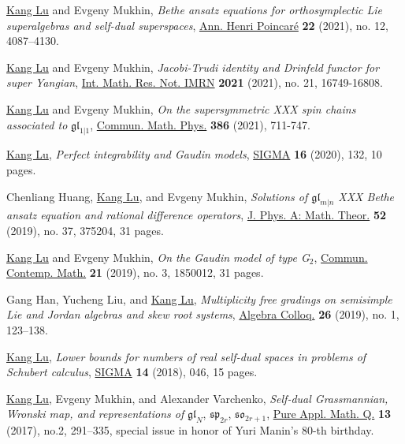\documentclass[11pt,letterpaper,roman,colorlinks,urlcolor=blue,linkcolor=blue
]{moderncv}
\begin{document}
\begin{etaremune}[leftmargin=1.17cm]
\item \underline{Kang Lu} and Evgeny Mukhin, {\textit{Bethe ansatz equations for orthosymplectic Lie superalgebras and self-dual superspaces}}, \href{https://doi.org/10.1007/s00023-021-01091-8}{Ann. Henri Poincar\'{e}} \textbf{22} (2021), no. 12, 4087--4130.

\item \underline{Kang Lu} and Evgeny Mukhin, {\textit{Jacobi-Trudi identity and Drinfeld functor for super Yangian}}, \href{https://dx.doi.org/10.1093/imrn/rnab023}{Int. Math. Res. Not. IMRN} \textbf{2021} (2021), no. 21, 16749-16808.

\item \underline{Kang Lu} and Evgeny Mukhin, {\textit{On the supersymmetric XXX spin chains associated to} $\mathfrak{gl}_{1|1}$}, \href{https://dx.doi.org/10.1007/s00220-021-04155-2}{Commun. Math. Phys.} \textbf{386} (2021), 711-747.

\item \underline{Kang Lu}, \textit{Perfect integrability and Gaudin models}, \href{https://www.emis.de/journals/SIGMA/2020/132/}{SIGMA} \textbf{16} (2020), 132, 10 pages.
  
\item Chenliang Huang, \underline{Kang Lu}, and Evgeny Mukhin, {\textit{Solutions of $\mathfrak{gl}_{m|n}$ XXX Bethe ansatz equation and rational difference operators}}, \href{https://doi.org/10.1088/1751-8121/ab1960}{J. Phys. A: Math. Theor.} \textbf{52} (2019), no. 37, 375204, 31 pages.   
            
\item \underline{Kang Lu} and Evgeny Mukhin, {\textit{On the Gaudin model of type G$_2$}}, \href{https://doi.org/10.1142/S0219199718500128}{Commun. Contemp. Math.} \textbf{21} (2019), no. 3, 1850012, 31 pages.

\item Gang Han, Yucheng Liu, and \underline{Kang Lu}, {\textit{Multiplicity free gradings on semisimple Lie and Jordan algebras and skew root systems}}, \href{https://doi.org/10.1142/S1005386719000129}{Algebra Colloq.} {\textbf{26}} (2019), no. 1, 123--138.
            
\item \underline{Kang Lu}, {\textit{Lower bounds for numbers of real self-dual spaces in problems of Schubert calculus}}, \href{https://doi.org/10.3842/SIGMA.2018.046}{SIGMA} {\textbf{14}} (2018), 046, 15 pages. 
            
\item \underline{Kang Lu}, Evgeny Mukhin, and Alexander Varchenko, {\textit{Self-dual Grassmannian, Wronski map, and representations of} $\mathfrak{gl}_N$, $\mathfrak{sp}_{2r}$, $\mathfrak{so}_{2r+1}$}, \href{http://dx.doi.org/10.4310/PAMQ.2017.v13.n2.a4}{Pure Appl. Math. Q.} {\textbf{13}} (2017), no.2, 291--335, special issue in honor of Yuri Manin's 80-th birthday.
                    

\end{etaremune}
\end{document}
